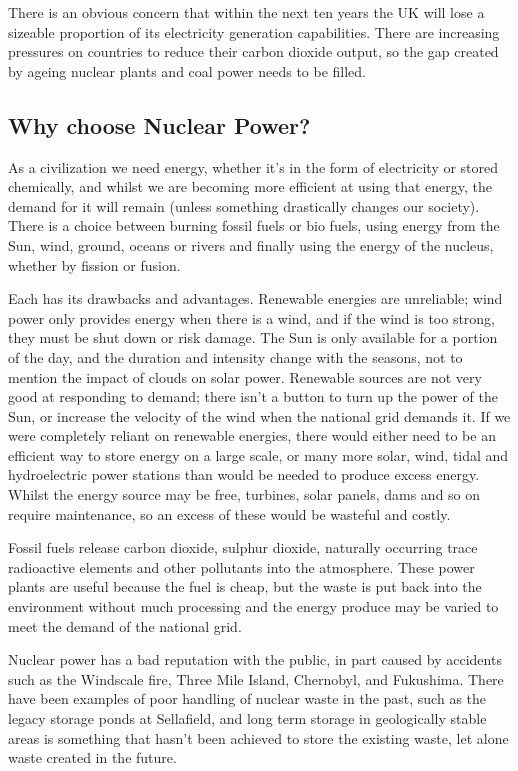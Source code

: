 There is an obvious concern that within the next ten years the UK will lose a sizeable proportion of its electricity generation capabilities.  There are increasing pressures on countries to reduce their carbon dioxide output, so the gap created by ageing nuclear plants and coal power needs to be filled.


\subsection{Why choose Nuclear Power?}

As a civilization we need energy, whether it's in the form of electricity or stored chemically, and whilst we are becoming more efficient at using that energy, the demand for it will remain (unless something drastically changes our society).  There is a choice between burning fossil fuels or bio fuels, using energy from the Sun, wind, ground, oceans or rivers and finally using the energy of the nucleus, whether by fission or fusion.

Each has its drawbacks and advantages.  Renewable energies are unreliable; wind power only provides energy when there is a wind, and if the wind is too strong, they must be shut down or risk damage.  The Sun is only available for a portion of the day, and the duration and intensity change with the seasons, not to mention the impact of clouds on solar power.  Renewable sources are not very good at responding to demand; there isn't a button to turn up the power of the Sun, or increase the velocity of the wind when the national grid demands it.  If we were completely reliant on renewable energies, there would either need to be an efficient way to store energy on a large scale, or many more solar, wind, tidal and hydroelectric power stations than would be needed to produce excess energy.  Whilst the energy source may be free, turbines, solar panels, dams and so on require maintenance, so an excess of these would be wasteful and costly.

Fossil fuels release carbon dioxide, sulphur dioxide, naturally occurring trace radioactive elements and other pollutants into the atmosphere.  These power plants are useful because the fuel is cheap, but the waste is put back into the environment without much processing and the energy produce may be varied to meet the demand of the national grid.  

Nuclear power has a bad reputation with the public, in part caused by accidents such as the Windscale fire, Three Mile Island, Chernobyl, and Fukushima.  There have been examples of poor handling of nuclear waste in the past, such as the legacy storage ponds at Sellafield, and long term storage in geologically stable areas is something that hasn't been achieved to store the existing waste, let alone waste created in the future.

